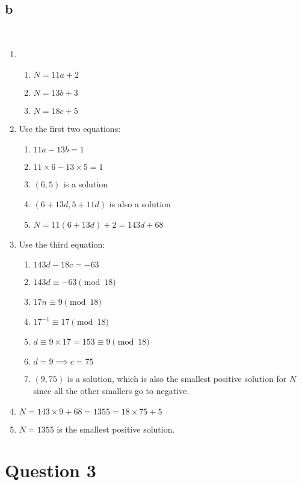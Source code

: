 \documentclass{article}
\begin{document}
~

\subsection*{b}

~

\begin{enumerate}
    \item \begin{enumerate}
        \item $N=11a+2$
        \item $N= 13b+3$
        \item $N=18c+5$
    \end{enumerate}
    \item Use the first two equations: 
    \begin{enumerate}
        \item $11a-13b=1$
        \item $11\times 6-13\times 5=1$
        \item $(6,5)$ is a solution
        \item $(6+13d,5+11d)$ is also a solution
        \item $N=11(6+13d)+2=143d+68$
    \end{enumerate}
    \item Use the third equation: 
    \begin{enumerate}
        \item $ 143d-18c=-63$
        \item $ 143d\equiv -63\pmod{18}$
        \item $ 17n\equiv 9\pmod{18}$
        \item $17^{-1}\equiv 17\pmod{18}$
        \item $d\equiv 9\times 17=153\equiv 9\pmod{18}$
        \item $d=9\implies c=75$
        \item $(9,75)$ is a solution, which is also the smallest positive solution for $N$ since all the other smallers go to negative.
    \end{enumerate}
    \item $N=143\times 9+68=1355=18\times 75+5$
    \item $N=1355$ is the smallest positive solution.
\end{enumerate}

\newpage

\section*{Question 3}
\end{document}
